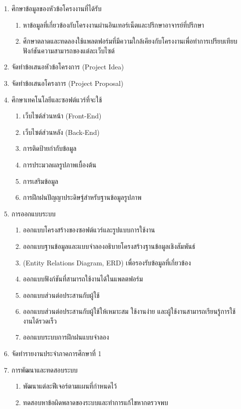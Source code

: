 \documentclass[12pt,oneside,openright,a4paper]{cpe-thai-project}
\begin{document}
\begin{enumerate}
\item ศึกษาข้อมูลของหัวข้อโครงงานที่ได้รับ
	\begin{enumerate}[label=\alph*.]
	\item หาข้อมูลที่เกี่ยวข้องกับโครงงานผ่านอินเทอร์เน็ตและปรึกษาอาจารย์ที่ปรึกษา
	\item ศึกษาตลาดและทดลองใช้แพลตฟอร์มที่มีความใกล้เคียงกับโครงงานเพื่อทําการเปรียบเทียบฟังก์ชันความสามารถของแต่ละเว็บไซต์
	\end{enumerate}
\item จัดทําข้อเสนอหัวข้อโครงการ (Project Idea)
\item จัดทําข้อเสนอโครงการ (Project Proposal)
\item ศึกษาเทคโนโลยีและซอฟต์แวร์ที่จะใช้
	\begin{enumerate}[label=\alph*.]
	\item เว็บไซต์ส่วนหน้า (Front-End)
	\item เว็บไซต์ส่วนหลัง (Back-End)
	\item การติดป้ายกำกับข้อมูล
	\item การประมวลผลรูปภาพเบื้องต้น
	\item การเสริมข้อมูล
	\item การฝึกฝนปัญญาประดิษฐ์สำหรับฐานข้อมูลรูปภาพ
	\end{enumerate}
\item การออกแบบระบบ
	\begin{enumerate}[label=\alph*.]
	\item ออกแบบโครงสร้างของซอฟต์แวร์และรูปแบบการใช้งาน
	\item ออกแบบฐานข้อมูลและแบบจำลองอธิบายโครงสร้างฐานข้อมูลเชิงสัมพันธ์ 
	\item (Entity Relations Diagram, ERD) เพื่อรองรับข้อมูลที่เกี่ยวข้อง
	\item ออกแบบฟังก์ชันที่สามารถใช้งานได้ในแพลตฟอร์ม
	\item ออกแบบส่วนต่อประสานกับผู้ใช้
	\item ออกแบบส่วนต่อประสานกับผู้ใช้ให้เหมาะสม ใช้งานง่าย และผู้ใช้งานสามารถเรียนรู้การใช้งานได้รวดเร็ว
	\item ออกแบบระบบการฝึกฝนแบบจำลอง
	\end{enumerate}
\item จัดทํารายงานประจําภาคการศึกษาที่ 1
\item การพัฒนาและทดสอบระบบ
	\begin{enumerate}[label=\alph*.]
	\item พัฒนาแต่ละฟีเจอร์ตามแผนที่กำหนดไว้
	\item ทดสอบหาข้อผิดพลาดของระบบและทำการแก้ไขหากตรวจพบ

\end{enumerate}
\end{enumerate}
\end{document}
